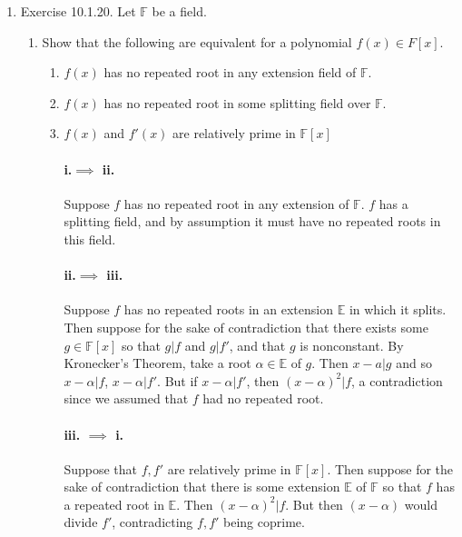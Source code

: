 \documentclass{article}
\begin{document}
\begin{enumerate} 

\item Exercise 10.1.20. Let $\mathbb{F}$ be a field.
    \begin{enumerate}
        \item Show that the following are equivalent for a polynomial $f (x) \in  F[x].$
            \begin{enumerate}
                \item $f (x)$ has no repeated root in any extension field of $\mathbb{F}$.
                \item $f (x)$ has no repeated root in some splitting field over $\mathbb{F}$.
                \item $f (x)$ and $f '(x)$ are relatively prime in $\mathbb{F}[x]$
                    \paragraph{i.$\implies$ ii.} Suppose $f$ has no repeated root in any extension 
                    of $\mathbb{F}$. $f$ has a splitting field, and by assumption it must have no repeated
                    roots in this field. 
                    \paragraph{ii.$\implies$ iii.} Suppose $f$ has no repeated roots in an extension
                    $\mathbb{E}$ in which it splits. Then suppose for the sake of 
                    contradiction that there exists some $g\in \mathbb{F}[x]$ so that $g|f$ and $g|f'$,
                    and that $g$ is nonconstant. By Kronecker's Theorem, take a root $\alpha\in \mathbb{E}$
                    of $g$. Then $x-a|g$ and so $x-\alpha|f$, $x-\alpha|f'$. But if $x-\alpha|f'$, then
                    $(x-\alpha)^2|f$, a contradiction since we assumed that $f$ had no repeated root.

                    \paragraph{iii. $\implies$ i. } Suppose that $f,f'$ are relatively prime in
                    $\mathbb{F}[x]$. Then suppose for the sake of contradiction that there is some
                    extension $\mathbb{E}$ of $\mathbb{F}$ so that $f$ has a repeated root in $\mathbb{E}$.
                    Then $(x-\alpha)^2|f$. But then $(x-\alpha)$ would divide $f'$, contradicting
                    $f,f'$ being coprime. 
                    

\end{enumerate}
\end{enumerate}
\end{enumerate}
\end{document}
